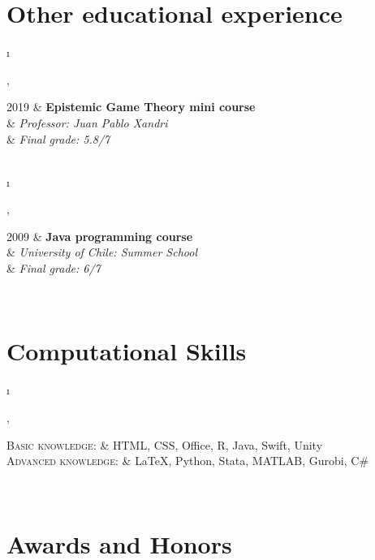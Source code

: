 \documentclass[a4paper, 10pt]{article}
\newcommand{\tablength}{}
\newcommand{\setTabParams}[1]{\renewcommand\tablength{}\forcsvlist{\listadd\tablength}{#1}}
\newcommand{\setCols}[1]{			%
	\ifnum0=\i						%
		\ifdim0cm=#1				%
			\def \firstCol {r}		%
		\else						%
			\def \firstCol {p{#1}}		%
		\fi						%
	\else \ifnum1=\i				%
		\ifdim0cm=#1				%
			\def \secondCol {l}		%
		\else						%
			\def \secondCol{p{#1}}	%
		\fi						%
	\else \ifnum2=\i				%
		\ifnum0=#1				%
			\def \sep {}			%
		\else						%
			\def \sep {|}			%
		\fi						%
	\fi \fi \fi						%
	\advance\i by1					%
}
\newcommand{\tab}[1]{					%
	\newcount\i						%
	\forlistloop{\setCols}{\tablength}		%
	\begin{tabular}{\firstCol \sep \secondCol}	%
		#1							%
	\end{tabular} \\						%
}
\begin{document}
\section{Other educational experience}
\setTabParams{0cm,11cm,0}

\tab{
\textsc{2019}
 	&	\textbf{Epistemic Game Theory mini course }	\\[0.2ex]
	&	\emph{\quad Professor: Juan Pablo Xandri}		\\[0.2ex]
	&	\emph{\quad Final grade: 5.8/7}
}

\tab{
\textsc{2009}
 	&	\textbf{Java programming course}	\\[0.2ex]
	&	\emph{\quad University of Chile: Summer School}		\\[0.2ex]
	&	\emph{\quad Final grade: 6/7}
}

\section{Computational Skills}
\setTabParams{0cm,0cm,0}

\tab{
\textsc{Basic knowledge:}
	&	HTML, CSS, Office, R, Java, Swift, Unity 	\\[0.5ex]

\textsc{Advanced knowledge:}
	&	{\LaTeX}, Python, Stata, MATLAB, Gurobi, C\#	\\
}

\section{Awards and Honors}
\setTabParams{0cm,11cm,0}
\end{document}
